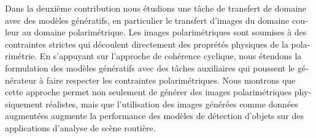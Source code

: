 \begin{otherlanguage}{french}
Dans la deuxième contribution nous étudions une tâche de transfert de domaine avec des modèles génératifs, en particulier le transfert d'images du domaine couleur au domaine polarimétrique. Les images polarimétriques sont soumises à des contraintes strictes qui découlent directement des proprétés physiques de la polarimétrie. En s'appuyant sur l'approche de cohérence cyclique, nous étendons la formulation des modèles génératifs avec des tâches auxiliaires qui poussent le générateur à faire respecter les contraintes polarimétriques. Nous montrons que cette approche permet non seulement de générer des images polarimétriques physiquement réalistes, mais que l'utilisation des images générées comme données augmentées augmente la performance des modèles de détection d'objets sur des applications d'analyse de scène routière.
\end{otherlanguage}
